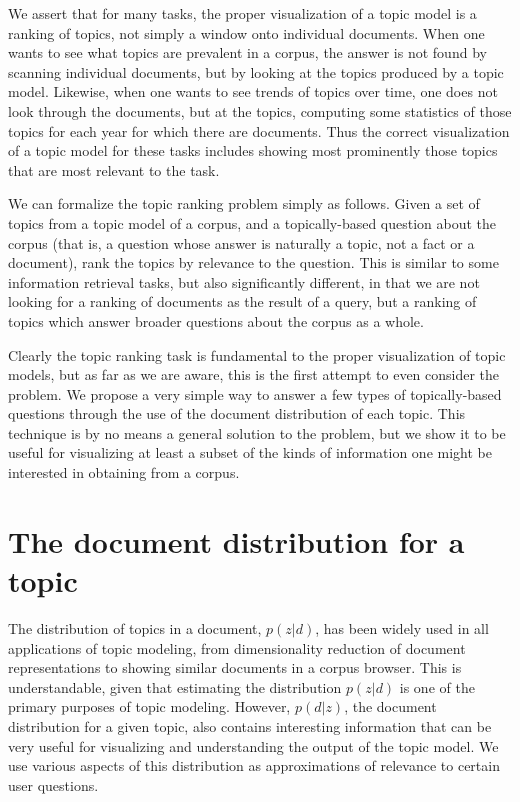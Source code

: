 \documentclass{article}
\begin{document}
We assert that for many tasks, the proper visualization of a topic model is a
ranking of topics, not simply a window onto individual documents.  When one
wants to see what topics are prevalent in a corpus, the answer is not found by
scanning individual documents, but by looking at the topics produced by a topic
model.  Likewise, when one wants to see trends of topics over time, one does
not look through the documents, but at the topics, computing some statistics of
those topics for each year for which there are documents.  Thus the correct
visualization of a topic model for these tasks includes showing most
prominently those topics that are most relevant to the task.

We can formalize the topic ranking problem simply as follows.  Given a set of
topics from a topic model of a corpus, and a topically-based question about the
corpus (that is, a question whose answer is naturally a topic, not a fact or a
document), rank the topics by relevance to the question.  This is similar to
some information retrieval tasks, but also significantly different, in that we
are not looking for a ranking of documents as the result of a query, but a
ranking of topics which answer broader questions about the corpus as a whole.

Clearly the topic ranking task is fundamental to the proper visualization of
topic models, but as far as we are aware, this is the first attempt to even
consider the problem.  We propose a very simple way to answer a few types of
topically-based questions through the use of the document distribution of each
topic.  This technique is by no means a general solution to the problem, but we
show it to be useful for visualizing at least a subset of the kinds of
information one might be interested in obtaining from a corpus.

\section{The document distribution for a topic}
\label{sec:docdist}

The distribution of topics in a document, $p(z|d)$, has been widely used in all
applications of topic modeling, from dimensionality reduction of document
representations to showing similar documents in a corpus browser.  This is
understandable, given that estimating the distribution $p(z|d)$ is one of the
primary purposes of topic modeling.  However, $p(d|z)$, the document
distribution for a given topic, also contains interesting information that can
be very useful for visualizing and understanding the output of the topic model.
We use various aspects of this distribution as approximations of relevance to
certain user questions.
\end{document}
